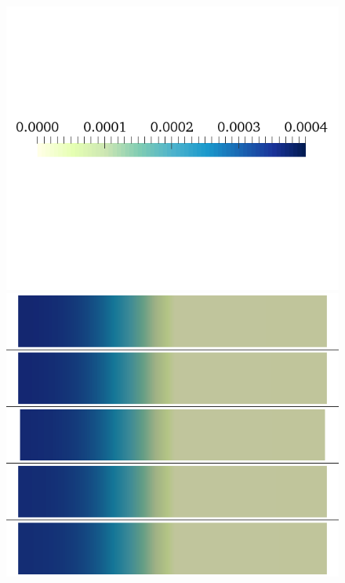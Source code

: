 \documentclass[12pt,a4paper]{article}
\begin{document}
%
\begin{figure}
\begin{minipage}{0.5\textwidth}
\includegraphics[trim=0cm 7cm 0cm 6cm, clip=true, width=1\linewidth]{legend_cai}
\includegraphics[trim=0cm 0cm 0cm 0cm, clip=true, width=1\linewidth]{cai_gkr}
    \end{minipage}
    \begin{minipage}{0.5\textwidth}

\end{minipage}
\end{figure}
\end{document}
